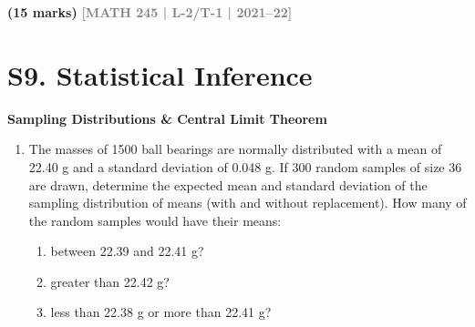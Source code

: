 \documentclass[12pt,a4paper]{article}
\newcommand{\yr}[1]{\hfill\textcolor{gray}{\small\textbf{[#1]}}}
\newcommand{\mk}[1]{\textcolor{orange!70!black}{\small\textbf{(#1 marks)}}}
\newcommand{\subtopic}[2]{%
  \vspace{10pt}
  \noindent\begin{tcolorbox}[colback=#1!8,colframe=#1,boxrule=0.6pt,arc=4pt,
    left=6pt,right=6pt,top=4pt,bottom=4pt]
    \small\bfseries\textcolor{#1}{#2}
  \end{tcolorbox}
  \vspace{2pt}
}
\begin{document}
\begin{enumerate}
\mk{15} \yr{MATH 245 | L-2/T-1 | 2021--22}



\end{enumerate}


\section{S9. Statistical Inference}
\label{sec:S9}

\subtopic{cG}{Sampling Distributions \& Central Limit Theorem}
\label{sub:s9-sampling}

\begin{enumerate}

\item The masses of 1500 ball bearings are normally distributed with a mean of 22.40 g and a standard deviation of 0.048 g. If 300 random samples of size 36 are drawn, determine the expected mean and standard deviation of the sampling distribution of means (with and without replacement). How many of the random samples would have their means:
\begin{enumerate}
  \item between 22.39 and 22.41 g?
  \item greater than 22.42 g?
  \item less than 22.38 g or more than 22.41 g?
\end{enumerate}

\begin{center}
\end{center}


\end{enumerate}
\end{document}
